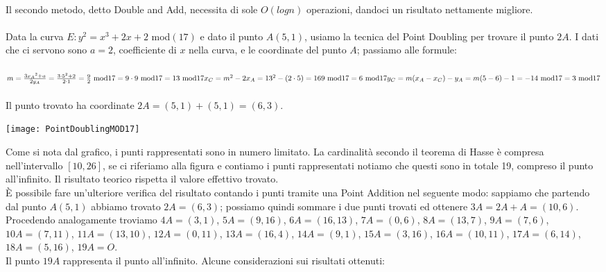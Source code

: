 \documentclass[a4paper,12pt]{tesiinfo}
\begin{document}
\\
Il secondo metodo, detto Double and Add, necessita di sole $O(log n)$ operazioni, dandoci un risultato nettamente migliore.
\\
\\
Data la curva $E: y^2 = x^3 +2x +2$ mod$(17)$ e dato il punto $A(5, 1)$, usiamo la tecnica del Point Doubling per trovare il punto $2A$.
I dati che ci servono sono $a = 2$, coefficiente di $x$ nella curva, e le coordinate del punto $A$; passiamo alle formule:
\\
\\
$m = \frac{3{x_A}^2 + a}{2y_A}= \frac{3 \cdot 5^2 + 2}{2 \cdot 1} = \frac{9}{2} \text{ mod}17= 9 \cdot 9 \text{ mod}17 = 13\text{ mod}17\\
x_C = m^2 - 2x_A= 13^2 - (2 \cdot 5) = 169\text{ mod}17 = 6 \text{ mod}17\\
y_C = m(x_A - x_C)-y_A= m(5 - 6)-1 = -14\text{ mod}17 = 3\text{ mod}17
$
\\
\\
Il punto trovato ha coordinate $2A = (5, 1)+(5, 1) = (6, 3)$.
\\
\begin{center}
\texttt{[image: PointDoublingMOD17]}
\end{center}
Come si nota dal grafico, i punti rappresentati sono in numero limitato. La cardinalit\`a secondo il teorema di Hasse \`e compresa nell'intervallo $[10, 26]$, se ci riferiamo alla figura e contiamo i punti rappresentati notiamo che questi sono in totale 19, compreso il punto all'infinito. Il risultato teorico rispetta il valore effettivo trovato.
\\
\`E possibile fare un'ulteriore verifica del risultato contando i punti tramite una Point Addition nel seguente modo: sappiamo che partendo dal punto $A(5, 1)$ abbiamo trovato $2A = (6, 3)$; possiamo quindi sommare i due punti trovati ed ottenere $3A = 2A + A = (10, 6)$. Procedendo analogamente troviamo $4A = (3, 1)$, $5A = (9, 16)$, $6A = (16, 13)$, $7A = (0, 6)$, $8A = (13, 7)$, $9A = (7, 6)$, $10A = (7, 11)$, $11A = (13, 10)$, $12A = (0, 11)$, $13A = (16, 4)$,  $14A = (9, 1)$, $15A = (3, 16)$, $16A = (10, 11)$, $17A = (6, 14)$, $18A = (5, 16)$, $19A = O$.
\\
Il punto $19A$ rappresenta il punto all'infinito.
Alcune considerazioni sui risultati ottenuti:
\end{document}
